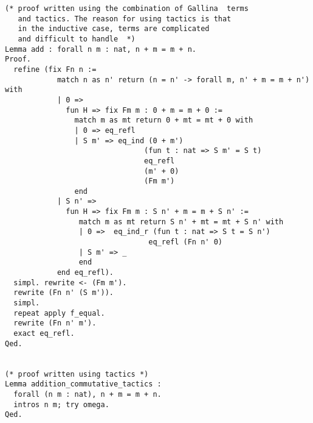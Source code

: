 \begin{verbatim}
(* proof written using the combination of Gallina  terms 
   and tactics. The reason for using tactics is that  
   in the inductive case, terms are complicated 
   and difficult to handle  *)
Lemma add : forall n m : nat, n + m = m + n.
Proof.
  refine (fix Fn n :=
            match n as n' return (n = n' -> forall m, n' + m = m + n') with
            | 0 =>
              fun H => fix Fm m : 0 + m = m + 0 :=
                match m as mt return 0 + mt = mt + 0 with
                | 0 => eq_refl
                | S m' => eq_ind (0 + m')
                                (fun t : nat => S m' = S t)
                                eq_refl
                                (m' + 0)
                                (Fm m')
                end                  
            | S n' =>
              fun H => fix Fm m : S n' + m = m + S n' :=
                 match m as mt return S n' + mt = mt + S n' with
                 | 0 =>  eq_ind_r (fun t : nat => S t = S n')
                                 eq_refl (Fn n' 0)
                 | S m' => _
                 end                
            end eq_refl).
  simpl. rewrite <- (Fm m').
  rewrite (Fn n' (S m')).
  simpl.
  repeat apply f_equal.
  rewrite (Fn n' m').
  exact eq_refl.
Qed.


(* proof written using tactics *)
Lemma addition_commutative_tactics :
  forall (n m : nat), n + m = m + n.
  intros n m; try omega.
Qed.
\end{verbatim}



